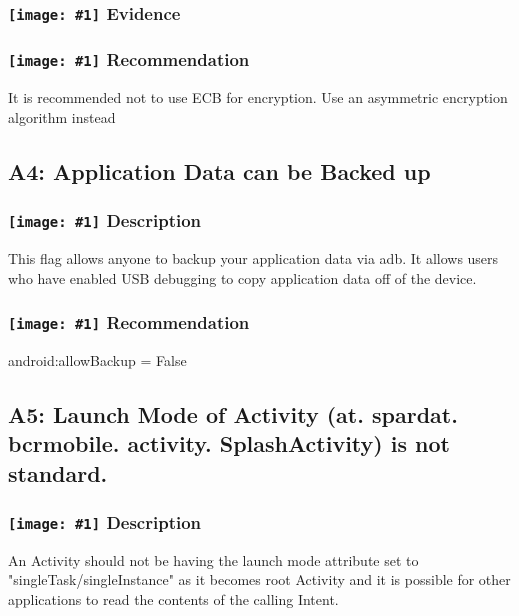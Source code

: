 \documentclass[12p]{article}
\newcommand{\icon}[1]{\texttt{[image: \#1]}}
\begin{document}
\subsubsection*{\protect\icon{/home/miki/Documents/GITHUB/AndroidPermissions/python/vulns/report_icons/basic_magnifier.png} Evidence}

\subsubsection*{\protect\icon{/home/miki/Documents/GITHUB/AndroidPermissions/python/vulns/report_icons/basic_todo.png} Recommendation}
It is recommended not to use ECB for encryption. Use an asymmetric encryption algorithm instead
\subsection{A4: Application Data can be Backed up}
\subsubsection*{\protect\icon{/home/miki/Documents/GITHUB/AndroidPermissions/python/vulns/report_icons/basic_sheet.png} Description}
This flag allows anyone to backup your application data via adb. It allows users who have enabled USB debugging to copy application data off of the device.
\subsubsection*{\protect\icon{/home/miki/Documents/GITHUB/AndroidPermissions/python/vulns/report_icons/basic_todo.png} Recommendation}
android:allowBackup = False
\subsection{A5: Launch Mode of Activity (at. spardat. bcrmobile. activity. SplashActivity) is not standard.}
\subsubsection*{\protect\icon{/home/miki/Documents/GITHUB/AndroidPermissions/python/vulns/report_icons/basic_sheet.png} Description}
An Activity should not be having the launch mode attribute set to "singleTask/singleInstance" as it becomes root Activity and it is possible for other applications to read the contents of the calling Intent.
\end{document}
